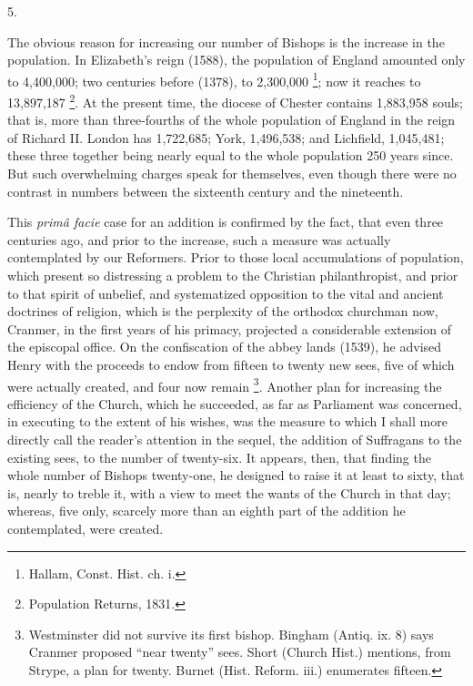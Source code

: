 5.

The obvious reason for increasing our number of
Bishops is the increase in the population. In Elizabeth's reign
(1588), the population of England amounted only to 4,400,000; two
centuries before (1378), to 2,300,000 \footnote{Hallam, Const. Hist. ch. i.}; now it reaches to 13,897,187 \footnote{Population Returns, 1831.}. At the present time, the diocese of Chester contains 1,883,958
souls; that is, more than three-fourths of the whole population of
England in the reign of Richard II. London has 1,722,685; York,
1,496,538; and Lichfield, 1,045,481; these three together being nearly
equal to the whole population 250 years since. But such overwhelming
charges speak for themselves, even though there were no contrast
in numbers between the sixteenth century and the nineteenth.

This \emph{primâ facie} case for an addition is
confirmed by the fact, that even three centuries ago, and prior to the
increase, such a measure was actually contemplated by our Reformers.
Prior to those local accumulations of population, which present so
distressing a problem to the Christian philanthropist, and prior to
that spirit of unbelief, and systematized opposition to the vital and
ancient doctrines of religion, which is the perplexity of the orthodox
churchman now, Cranmer, in the first years of his primacy, projected a
considerable extension of the episcopal office. On the confiscation of
the abbey lands (1539), he advised Henry with the proceeds to endow
from fifteen to twenty new sees, five of which were actually created,
and four now remain \footnote{Westminster did not survive its first bishop. Bingham (Antiq. ix. 8)
says Cranmer proposed ``near twenty'' sees. Short (Church Hist.)
mentions, from Strype, a plan for twenty. Burnet (Hist. Reform. iii.)
enumerates fifteen.}.
Another plan for increasing the efficiency of the Church, which he
succeeded, as far as Parliament was concerned, in executing to the
extent of his wishes, was the measure to which I shall more directly
call the reader's attention in the sequel, the addition of Suffragans
to the existing sees, to the number of twenty-six. It appears, then,
that finding the whole number of Bishops twenty-one, he designed to
raise it at least to sixty, that is, nearly to treble it, with a view
to meet the wants of the Church in that day; whereas, five only,
scarcely more than an eighth part of the addition he contemplated,
were created.

